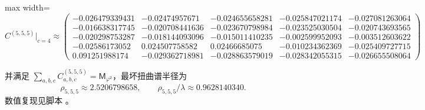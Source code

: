\begin{center}
\begin{adjustbox}{max width=\linewidth}
\(
C^{(5,5,5)}\big|_{c=4}\approx
\begin{pmatrix}
-0.026479339431 & -0.02474957671 & -0.024655658281 & -0.025847021174 & -0.027081263064\\
-0.016638317745 & -0.020708441636 & -0.023670798984 & -0.023525030504 & -0.020743693565\\
-0.020298753287 & -0.018144093096 & -0.015011410235 & -0.002599952093 & -0.003512603622\\
-0.02586173052 & 0.024507758582 & 0.02466685075 & -0.010234362369 & -0.025409727715\\
0.091251988174 & -0.029362718981 & -0.028863579019 & -0.028342055315 & -0.026655508064
\end{pmatrix}
\)
\end{adjustbox}
\end{center}
并满足 $\sum_{a,b,c}C_{a,b,c}^{(5,5,5)}=\mathsf{M}_{\varphi^2}$，最坏扭曲谱半径为
\[
\rho_{5,5,5}\approx 2.5206798658,\qquad \rho_{5,5,5}/\lambda\approx 0.9628140340.
\]
数值复现见脚本 。
